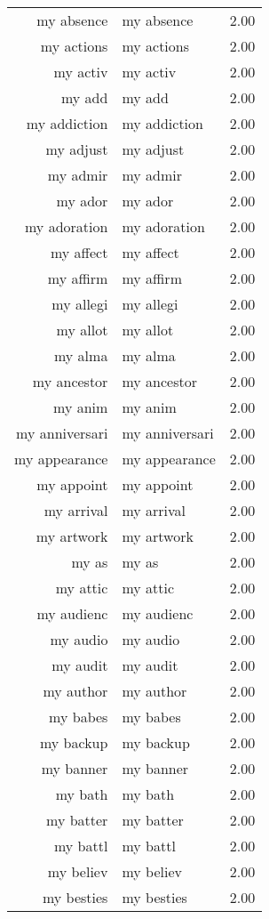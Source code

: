 \begin{table}[ht]
\begin{tabular}{rlr}
  my absence & my absence & 2.00 \\ 
  my actions & my actions & 2.00 \\ 
  my activ & my activ & 2.00 \\ 
  my add & my add & 2.00 \\ 
  my addiction & my addiction & 2.00 \\ 
  my adjust & my adjust & 2.00 \\ 
  my admir & my admir & 2.00 \\ 
  my ador & my ador & 2.00 \\ 
  my adoration & my adoration & 2.00 \\ 
  my affect & my affect & 2.00 \\ 
  my affirm & my affirm & 2.00 \\ 
  my allegi & my allegi & 2.00 \\ 
  my allot & my allot & 2.00 \\ 
  my alma & my alma & 2.00 \\ 
  my ancestor & my ancestor & 2.00 \\ 
  my anim & my anim & 2.00 \\ 
  my anniversari & my anniversari & 2.00 \\ 
  my appearance & my appearance & 2.00 \\ 
  my appoint & my appoint & 2.00 \\ 
  my arrival & my arrival & 2.00 \\ 
  my artwork & my artwork & 2.00 \\ 
  my as & my as & 2.00 \\ 
  my attic & my attic & 2.00 \\ 
  my audienc & my audienc & 2.00 \\ 
  my audio & my audio & 2.00 \\ 
  my audit & my audit & 2.00 \\ 
  my author & my author & 2.00 \\ 
  my babes & my babes & 2.00 \\ 
  my backup & my backup & 2.00 \\ 
  my banner & my banner & 2.00 \\ 
  my bath & my bath & 2.00 \\ 
  my batter & my batter & 2.00 \\ 
  my battl & my battl & 2.00 \\ 
  my believ & my believ & 2.00 \\ 
  my besties & my besties & 2.00 \\ 

\end{tabular}
\end{table}
